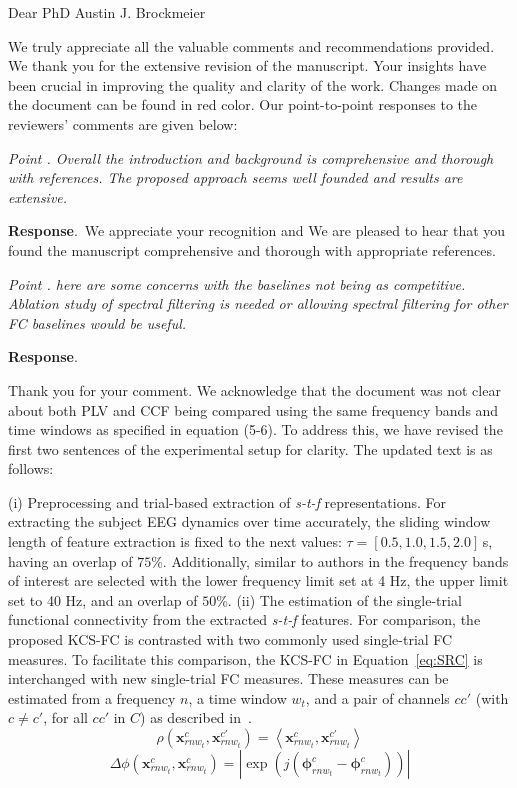 \documentclass[runningheads]{llncs}
\newcommand{\ve}[1]{\bm {#1}}
\newenvironment{reviewer}{\setcounter{pointcounter}{1}}{}
\newcommand{\changes}[1]{\textcolor[rgb]{1.00,0.00,0.00}{#1}}
\newcommand{\point}[1]{\medskip \noindent
 \textsl{{\fontseries{b}\selectfont Point \thepointcounter}.
 \stepcounter{pointcounter} #1}}
\newcommand{\reply}{\medskip \noindent \textbf{Response}.\ }
\newcommand{\initresponses}{\newcounter{pointcounter}}
\begin{document}
Dear PhD Austin J. Brockmeier

We truly appreciate all the valuable comments and recommendations provided. We thank you for the extensive revision of the manuscript. Your insights have been crucial in improving the quality and clarity of the work. Changes made on the document can be found in \changes{red color}. Our point-to-point responses to the reviewers' comments are given below:

\initresponses

\begin{reviewer}

\point{Overall the introduction and background is comprehensive and thorough with references. The proposed approach seems well founded and results are extensive.}

\reply{We appreciate your recognition and We are pleased to hear that you found the manuscript comprehensive and thorough with appropriate references.}


\point{here are some concerns with the baselines not being as competitive. Ablation study of spectral filtering is needed or allowing spectral filtering for other FC baselines would be useful.}

\reply{Thank you for your comment. We acknowledge that the document was not clear about both PLV and CCF being compared using the same frequency bands and time windows as specified in equation (5-6). To address this, we have revised the first two sentences of the experimental setup for clarity. The updated text is as follows:

\changes{
({i}) Preprocessing and trial-based extraction of \textit{s-t-f} representations. For extracting the subject EEG dynamics over time accurately, the sliding window length of feature extraction is fixed to the next values: $\tau=[0.5,1.0,1.5,2.0]$\,{s}, having an overlap of $75\%$. Additionally, similar to authors in \cite{ang2008filter} the frequency bands of interest are selected with the lower frequency limit set at 4 Hz, the upper limit set to 40 Hz, and an overlap of $50\%$. \cite{ang2008filter}
}
\changes{
({ii}) The estimation of the single-trial functional connectivity from the extracted \textit{s-t-f} features. For comparison, the proposed KCS-FC is contrasted with two commonly used single-trial FC measures. To facilitate this comparison, the KCS-FC in Equation~\eqref{eq:SRC} is interchanged with new single-trial FC measures. These measures can be estimated from a frequency $n$, a time window $w_t$, and a pair of channels ${cc'}$ (with $c \neq c'$, for all $cc'$ in $C$) as described in~\cite{rodrigue2019}.
\begin{equation}
			\rho(\ve{x}^{c}_{rnw_t},\ve{x}^{c'}_{rnw_t}) ={\left<\ve{x}^{c}_{rnw_t},\ve{x}^{c'}_{rnw_t}\right>}\label{Eq:Pearson}
\end{equation}
\begin{equation}		 
	{\Delta\phi(\ve{x}^{c}_{rnw_t},\ve{x}^{c}_{rnw_t})}  {= {|\exp(j(\ve{\phi}_{rnw_t}^{c}-\ve{\phi}_{rnw_t}^{c}))|}} \label{Eq:PLV} 
\end{equation}
} 
}


\end{reviewer}
\end{document}
